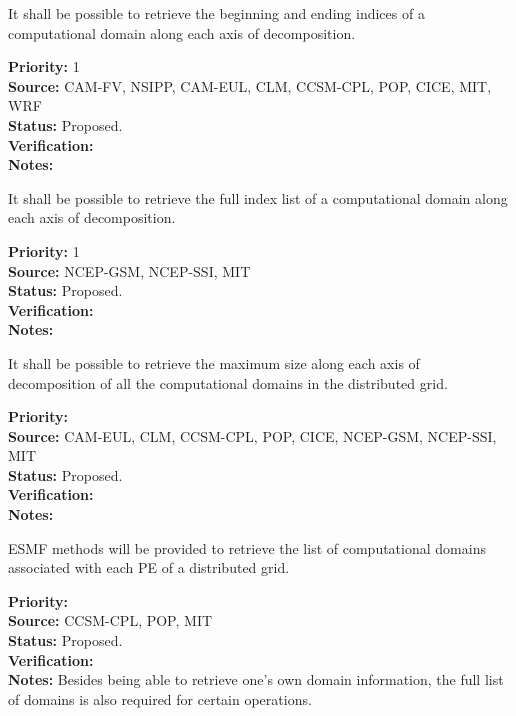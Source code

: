 
It shall be possible to retrieve the beginning and ending indices of a
computational domain along each axis of decomposition.

\begin{reqlist}
{\bf Priority:} 1 \\ 
{\bf Source:} CAM-FV, NSIPP, CAM-EUL, CLM, CCSM-CPL, POP, CICE, MIT, WRF \\
{\bf Status:} Proposed. \\
{\bf Verification:} \\
{\bf Notes:}
\end{reqlist}


It shall be possible to retrieve the full index list of a
computational domain along each axis of decomposition.

\begin{reqlist}
{\bf Priority:} 1 \\ 
{\bf Source:} NCEP-GSM, NCEP-SSI, MIT \\
{\bf Status:} Proposed. \\
{\bf Verification:} \\
{\bf Notes:}
\end{reqlist}


It shall be possible to retrieve the maximum size along each axis of
decomposition of all the computational domains in the distributed grid. 

\begin{reqlist}
{\bf Priority:} \\ 
{\bf Source:} CAM-EUL, CLM, CCSM-CPL, POP, CICE, NCEP-GSM, NCEP-SSI, MIT \\
{\bf Status:} Proposed. \\
{\bf Verification:} \\
{\bf Notes:}
\end{reqlist}


ESMF methods will be provided to retrieve the list of computational
domains associated with each PE of a distributed grid.

\begin{reqlist}
{\bf Priority:} \\ 
{\bf Source:} CCSM-CPL, POP, MIT \\
{\bf Status:} Proposed. \\
{\bf Verification:} \\
{\bf Notes:} Besides being able to retrieve one's own domain
  information, the full list of domains is also required for certain
  operations.
\end{reqlist}

